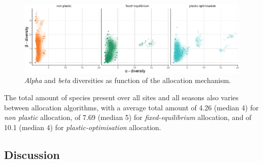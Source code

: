 \begin{figure}\label{fig:diversities}
\includegraphics[]{./2_PP/Figures/Comm/comm_div_differences_alpha_beta.png}
\caption[\textit{Alpha} and \textit{beta} diversities as function of the allocation mechanism.]{\textit{Alpha} and \textit{beta} diversities as function of the allocation mechanism.}
\end{figure}

The total amount of species present over all sites and all seasons also varies between allocation algorithms, with a average total amount of 4.26 (median 4) for \textit{non plastic} allocation, of 7.69 (median 5) for \textit{fixed-equilibrium} allocation, and of 10.1 (median 4) for \textit{plastic-optimisation} allocation.



\subsection{Discussion}



